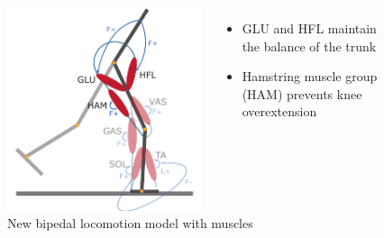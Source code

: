 \documentclass[10pt]{beamer}
\begin{document}
\begin{frame}
\begin{figure}
\begin{overprint}
				\begin{columns}
					\begin{column}{.5\textwidth}
						\includegraphics[height=.5\textheight]{images/new_model/stance/muscle_vas_sol_gas_ta_ham_glu_hfl_floor.pdf} 
						\caption{New bipedal locomotion model with muscles}
					\end{column}
					\begin{column}{.5\textwidth}
						\begin{exampleblock}{}
							\begin{itemize}
								\item GLU and HFL maintain the balance of the trunk  \\ [1em]
								\item Hamstring muscle group (HAM) prevents knee overextension
							\end{itemize}
						\end{exampleblock}
					\end{column}
				\end{columns}	
			\end{overprint}			
		\end{figure}
		
	\end{frame}
	
\end{document}
